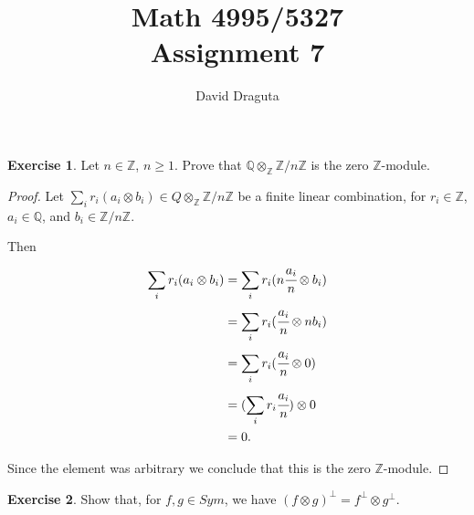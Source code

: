 \documentclass[12pt]{extarticle}
\title{ Math 4995/5327
  \\
  Assignment 7}
\author{David Draguta}
\newcommand{\Q}{\mathbb{Q}}
\newcommand{\Z}{\mathbb{Z}}
\newcommand{\<}{\langle}
\renewcommand{\>}{\rangle}
\theoremstyle{definition}
\newtheorem{exercise}{Exercise}
\begin{document}
\maketitle

\begin{exercise}
  Let $n \in \Z$, $n \geq 1$. Prove that $\Q \otimes_{\Z} \Z/n\Z$ is the zero $\Z$-module.
\end{exercise}

\begin{proof}
  Let $\sum \limits_i r_i(a_i \otimes b_i) \in Q \otimes_{\Z}\Z/n\Z$ be a finite linear combination, for $r_i \in \Z$, $a_i \in \Q$, and $b_i \in \Z/n\Z$.

  Then
  \begin{align*}
    \sum \limits_i r_i(a_i \otimes b_i) 
    &= \sum \limits_i r_i(n\cfrac{a_i}{n} \otimes b_i) \\
    &= \sum \limits_i r_i(\cfrac{a_i}{n} \otimes nb_i) \\
    &= \sum \limits_i r_i(\cfrac{a_i}{n} \otimes 0) \\
    &= (\sum \limits_i r_i\cfrac{a_i}{n}) \otimes 0 \\
    &= 0.
  \end{align*}

  Since the element was arbitrary we conclude that this is the zero $\Z$-module.
\end{proof}

\begin{exercise}
  Show that, for $f,g \in Sym$, we have $(f \otimes g)^{\perp} = f^{\perp} \otimes g^{\perp}$.
\end{exercise}
\end{document}
